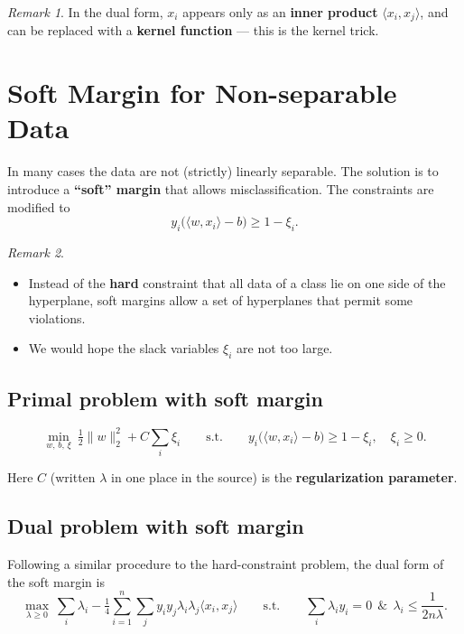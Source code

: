 \documentclass[
  letterpaper,
  DIV=11,
  numbers=noendperiod]{scrreprt}
\providecommand{\tightlist}{%
  \setlength{\itemsep}{0pt}\setlength{\parskip}{0pt}}
\theoremstyle{definition}
\theoremstyle{plain}
\theoremstyle{plain}
\theoremstyle{definition}
\theoremstyle{plain}
\theoremstyle{plain}
\theoremstyle{remark}
\newtheorem*{remark}{Remark}
\begin{document}
\begin{remark}
In the dual form, \(x_i\) appears only as an \textbf{inner product}
\(\langle x_i, x_j\rangle\), and can be replaced with a \textbf{kernel
function} --- this is the kernel trick.
\end{remark}

\section{Soft Margin for Non-separable
Data}\label{soft-margin-for-non-separable-data}

In many cases the data are not (strictly) linearly separable. The
solution is to introduce a \textbf{``soft'' margin} that allows
misclassification. The constraints are modified to \[
y_i\big(\langle w, x_i\rangle - b\big) \ge 1 - \xi_i .
\]

\begin{remark}
\leavevmode

\begin{itemize}
\tightlist
\item
  Instead of the \textbf{hard} constraint that all data of a class lie
  on one side of the hyperplane, soft margins allow a set of hyperplanes
  that permit some violations.
\item
  We would hope the slack variables \(\xi_i\) are not too large.
\end{itemize}

\end{remark}

\subsection{Primal problem with soft
margin}\label{primal-problem-with-soft-margin}

\[
\min_{w,\,b,\,\xi} \ \tfrac12 \|w\|_2^2 + C \sum_i \xi_i
\qquad\text{s.t.}\qquad
y_i\big(\langle w, x_i\rangle - b\big) \ge 1 - \xi_i, \quad \xi_i \ge 0 .
\]

Here \(C\) (written \(\lambda\) in one place in the source) is the
\textbf{regularization parameter}.

\subsection{Dual problem with soft
margin}\label{dual-problem-with-soft-margin}

Following a similar procedure to the hard-constraint problem, the dual
form of the soft margin is \[
\max_{\lambda \ge 0} \ \sum_i \lambda_i - \tfrac14 \sum_{i=1}^{n} \sum_j y_i y_j \lambda_i \lambda_j \langle x_i, x_j\rangle
\qquad\text{s.t.}\qquad
\sum_i \lambda_i y_i = 0 \ \ \&\ \ \lambda_i \le \frac{1}{2n\lambda} .
\]
\end{document}
